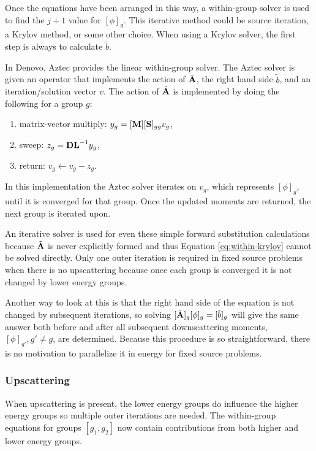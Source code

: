 Once the equations have been arranged in this way, a within-group solver is used to find the $j+1$ value for $[\phi]_{g}$. This iterative method could be source iteration, a Krylov method, or some other choice. When using a Krylov solver, the first step is always to calculate $\tilde{b}$. 

In Denovo, Aztec \cite{Heroux2007} provides the linear within-group solver. The Aztec solver is given an operator that implements the action of $\tilde{\mathbf{A}}$, the right hand side $\tilde{b}$, and an iteration/solution vector $v$. The action of $\tilde{\mathbf{A}}$ is implemented by doing the following for a group $g$:
\begin{enumerate}
  \item matrix-vector multiply: $y_{g} = [\mathbf{M}][\mathbf{S}]_{gg} v_{g}$,
  \item sweep: $z_{g} = \mathbf{DL}^{-1} y_{g}$,
  \item return: $v_{g} \leftarrow v_{g} - z_{g}$.
\end{enumerate}
In this implementation the Aztec solver iterates on $v_{g}$, which represents $[\phi]_{g}$, until it is converged for that group. Once the updated moments are returned, the next group is iterated upon. 

An iterative solver is used for even these simple forward substitution calculations because $\tilde{\mathbf{A}}$ is never explicitly formed and thus Equation \eqref{eq:within-krylov} cannot be solved directly. Only one outer iteration is required in fixed source problems when there is no upscattering because once each group is converged it is not changed by lower energy groups. 

Another way to look at this is that the right hand side of the equation is not changed by subsequent iterations, so solving $[\tilde{\mathbf{A}}]_{g} [\phi]_{g} = [\tilde{b}]_{g}$ will give the same answer both before and after all subsequent downscattering moments, $[\phi]_{g'}, g' \ne g$, are determined. Because this procedure is so straightforward, there is no motivation to parallelize it in energy for fixed source problems.

\subsubsection{Upscattering}
When upscattering is present, the lower energy groups do influence the higher energy groups so multiple outer iterations are needed. The within-group equations for groups $[g_{1}, g_{2}]$ now contain contributions from both higher and lower energy groups. 

